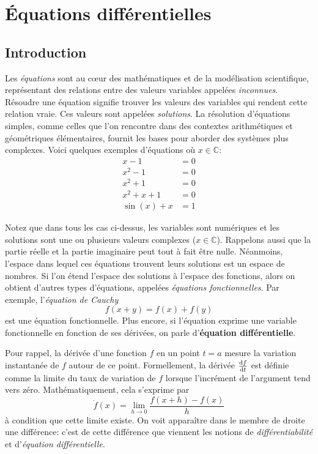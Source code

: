 \chapter{Équations différentielles}\label{chap:equadiff}
    \section{Introduction}
        Les \textit{équations} sont au cœur des mathématiques et de la modélisation scientifique, représentant des relations entre des valeurs variables appelées \textit{inconnues}. Résoudre une équation signifie trouver les valeurs des variables qui rendent cette relation vraie. Ces valeurs sont appelées \textit{solutions}. La résolution d’équations simples, comme celles que l’on rencontre dans des contextes arithmétiques et géométriques élémentaires, fournit les bases pour aborder des systèmes plus complexes. Voici quelques exemples d'équations où $x \in \mathbb{C}$:
        \begin{equation}
            \begin{split}
                x-1&=0\\
                x^2-1&=0\\
                x^2+1&=0\\
                x^2+x+1&=0\\
                \sin(x)+x&=1
            \end{split}
        \end{equation}
        
        Notez que dans tous les cas ci-dessus, les variables sont numériques et les solutions sont une ou plusieurs valeurs complexes ($x \in  \mathbb{C}$). Rappelons aussi que la partie réelle et la partie imaginaire peut tout à fait être nulle. Néanmoins, l'espace dans lequel ces équations trouvent leurs solutions est un espace de nombres. Si l'on étend l'espace des solutions à l'espace des fonctions, alors on obtient d'autres types d'équations, appelées \textit{équations fonctionnelles}. Par exemple, l'\textit{équation de Cauchy}
        \begin{equation}
            f(x + y) = f(x) + f(y)
        \end{equation}
        est une équation fonctionnelle. Plus encore, si l'équation exprime une variable fonctionnelle en fonction de ses dérivées, on parle d'\textbf{équation différentielle}.

        Pour rappel, la dérivée d'une fonction $f$ en un point $t = a$ mesure la variation instantanée de $f$ autour de ce point. Formellement, la dérivée $\frac {\mathrm d{f}}{\mathrm d{t}}$ est définie comme la limite du taux de variation de $f$ lorsque l'incrément de l'argument tend vers zéro. Mathématiquement, cela s'exprime par
        \begin{equation}
            \dot{f}(x) = \lim_{h \to 0} \frac{f(x+h) - f(x)}{h}
        \end{equation}
        à condition que cette limite existe. On voit apparaître dans le membre de droite une différence: c'est de cette différence que viennent les notions de \textit{différentiabilité} et d'\textit{équation différentielle}.
        
